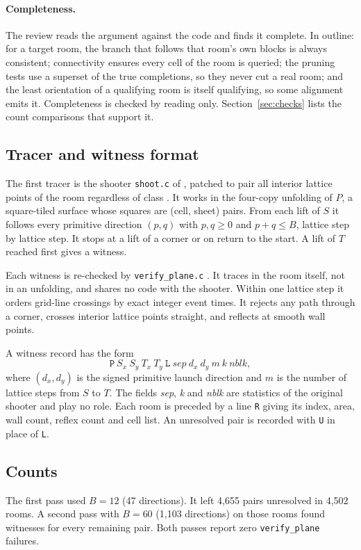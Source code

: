 \documentclass[11pt]{article}
\theoremstyle{definition}
\theoremstyle{remark}
\begin{document}
\paragraph{Completeness.}
The review \cite[\S1]{d102} reads the argument against the code and finds
it complete. In outline: for a target room, the branch that follows that
room's own blocks is always consistent; connectivity ensures every cell of
the room is queried; the pruning tests use a superset of the true
completions, so they never cut a real room; and the least orientation of
a qualifying room is itself qualifying, so some alignment emits it.
Completeness is checked by reading only. Section~\ref{sec:checks} lists
the count comparisons that support it.

\subsection{Tracer and witness format}
The first tracer is the shooter \texttt{shoot.c} of \cite{d9shoot}, patched
to pair all interior lattice points of the room regardless of class
\cite{qreadme}. It works in the four-copy unfolding of $P$, a square-tiled
surface whose squares are (cell, sheet) pairs. From each lift of $S$ it
follows every primitive direction $(p,q)$ with $p,q\ge0$ and $p+q\le B$,
lattice step by lattice step. It stops at a lift of a corner or on return
to the start. A lift of $T$ reached first gives a witness.

Each witness is re-checked by \texttt{verify\_plane.c} \cite{d9shoot}. It
traces in the room itself, not in an unfolding, and shares no code with the
shooter. Within one lattice step it orders grid-line crossings by exact
integer event times. It rejects any path through a corner, crosses interior
lattice points straight, and reflects at smooth wall points.

A witness record has the form
\[
\texttt{P}\ S_x\ S_y\ T_x\ T_y\ \texttt{L}\ \textit{sep}\ d_x\ d_y\ m\ \textit{k}\ \textit{nblk},
\]
where $(d_x,d_y)$ is the signed primitive launch direction and $m$ is the
number of lattice steps from $S$ to $T$. The fields \textit{sep}, \textit{k}
and \textit{nblk} are statistics of the original shooter and play no role.
Each room is preceded by a line \texttt{R} giving its index, area, wall
count, reflex count and cell list. An unresolved pair is recorded with
\texttt{U} in place of \texttt{L}.

\subsection{Counts}
The first pass used $B=12$ (47 directions). It left 4{,}655 pairs
unresolved in 4{,}502 rooms. A second pass with $B=60$ (1{,}103 directions)
on those rooms found witnesses for every remaining pair. Both passes report
zero \texttt{verify\_plane} failures.
\end{document}
